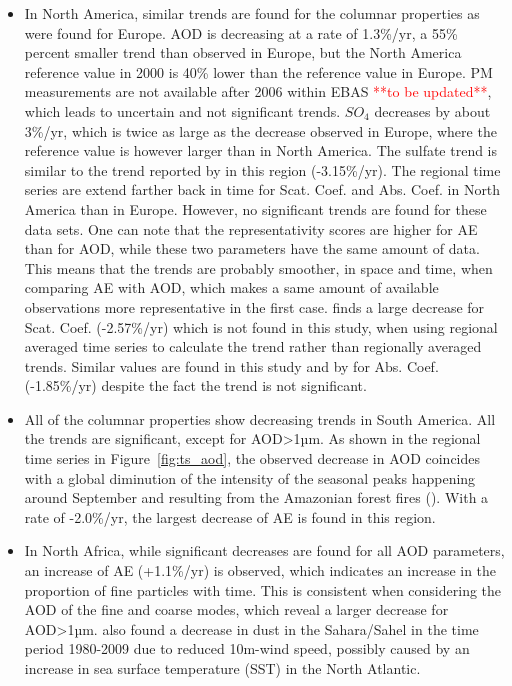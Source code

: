 \documentclass[journal abbreviation, manuscript]{copernicus}
\begin{document}
\begin{itemize}
 \item In North America, similar trends are found for the columnar properties as were found for Europe. AOD is decreasing at a rate of 1.3\%/yr, a 55\% percent smaller trend than observed in Europe, but the North America reference value in 2000 is 40\% lower than the reference value in Europe. PM measurements are not available after 2006 within EBAS \textcolor{red}{**to be updated**}, which leads to uncertain and not significant trends. $SO_{4}$ decreases by about 3\%/yr, which is twice as large as the decrease observed in Europe, where the reference value is however larger than in North America. The sulfate trend is similar to the trend reported by \cite{aas2019global} in this region (-3.15\%/yr). The regional time series are extend farther back in time for Scat. Coef. and Abs. Coef. in North America than in Europe. However, no significant trends are found for these data sets. One can note that the representativity scores are higher for AE than for AOD, while these two parameters have the same amount of data. This means that the trends are probably smoother, in space and time, when comparing AE with AOD, which makes a same amount of available observations more representative in the first case. \cite{collaudcoenprep} finds a large decrease for Scat. Coef. (-2.57\%/yr) which is not found in this study, when using regional averaged time series to calculate the trend rather than regionally averaged trends. Similar values are found in this study and by \cite{collaudcoenprep} for Abs. Coef. (-1.85\%/yr) despite the fact the trend is not significant.
 \item All of the columnar properties show decreasing trends in South America. All the trends are significant, except for AOD>1µm. As shown in the regional time series in Figure~\ref{fig:ts_aod}, the observed decrease in AOD coincides with a global diminution of the intensity of the seasonal peaks happening around September and resulting from the Amazonian forest fires (\cite{aragao201821st}). With a rate of -2.0\%/yr, the largest decrease of AE is found in this region.
 \item In North Africa, while significant decreases are found for all AOD parameters, an increase of AE (+1.1\%/yr) is observed, which indicates an increase in the proportion of fine particles with time. This is consistent when considering the AOD of the fine and coarse modes, which reveal a larger decrease for AOD>1µm. \cite{chin2014multi} also found a decrease in dust in the Sahara/Sahel in the time period 1980-2009 due to reduced 10m-wind speed, possibly caused by an increase in sea surface temperature (SST) in the North Atlantic.

\end{itemize}
\end{document}
